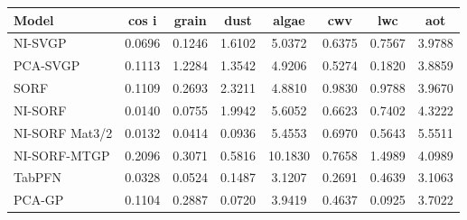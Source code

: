 \begin{tabular}{lccccccc}
\toprule
Model & cos i & grain & dust & algae & cwv & lwc & aot \\
\midrule
NI-SVGP & 0.0696 & 0.1246 & 1.6102 & 5.0372 & 0.6375 & 0.7567 & 3.9788 \\
PCA-SVGP & 0.1113 & 1.2284 & 1.3542 & 4.9206 & 0.5274 & 0.1820 & 3.8859 \\
SORF & 0.1109 & 0.2693 & 2.3211 & 4.8810 & 0.9830 & 0.9788 & 3.9670 \\
NI-SORF & 0.0140 & 0.0755 & 1.9942 & 5.6052 & 0.6623 & 0.7402 & 4.3222 \\
NI-SORF Mat3/2 & 0.0132 & 0.0414 & 0.0936 & 5.4553 & 0.6970 & 0.5643 & 5.5511 \\
NI-SORF-MTGP & 0.2096 & 0.3071 & 0.5816 & 10.1830 & 0.7658 & 1.4989 & 4.0989 \\
TabPFN & 0.0328 & 0.0524 & 0.1487 & 3.1207 & 0.2691 & 0.4639 & 3.1063 \\
PCA-GP & 0.1104 & 0.2887 & 0.0720 & 3.9419 & 0.4637 & 0.0925 & 3.7022 \\
\bottomrule
\end{tabular}